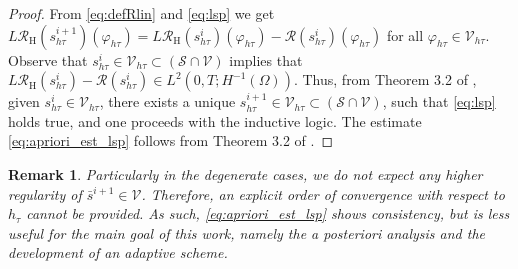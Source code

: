 \documentclass[review,11pt]{article}
\numberwithin{equation}{section}
\def \f  {\varphi}
\def \Om {\Omega}
\def \t  {\tau}
\def \calV {\mathcal{V}}
\def \calR {\mathcal{R}}
\def \resH {{\calR}_{\mathrm{H}}}
\def \calS {\mathcal{S}}
\newtheorem{remark}[remark]{Remark}
\begin{document}
\begin{proof}
From \eqref{eq:defRlin} and \eqref{eq:lsp} we get $ L\resH(s^{i+1}_{h\t})(\f_{h\t})= L\resH(s^{i}_{h\t})(\f_{h\t}) -\calR(s^{i}_{h\t})(\f_{h\t}) $ for all $\f_{h\t}\in \calV_{h\t}$. Observe that $s^{i}_{h\t}\in \calV_{h\t}\subset (\calS\cap \calV)$ implies that $L\resH(s^{i}_{h\t}) -\calR(s^{i}_{h\t})\in L^2(0,T;H^{-1}(\Om))$. Thus, from Theorem 3.2 of \cite{steinbach2015space}, given $s_{h\tau}^i\in \calV_{h\t}$, there exists a unique $s^{i+1}_{h\t}\in \calV_{h\t}\subset (\calS\cap \calV)$, such that \eqref{eq:lsp} holds true, and one proceeds with the inductive logic. The estimate \eqref{eq:apriori_est_lsp} follows from Theorem 3.2 of \cite{steinbach2015space}.
\end{proof}
\begin{remark}
Particularly in the degenerate cases, we do not expect any higher regularity of $\bar{s}^{i+1}\in \calV$. Therefore, an explicit order of convergence with respect to $h_\t$ cannot be provided. As such, \eqref{eq:apriori_est_lsp} shows consistency, but is less useful for the main goal of this work, namely the a posteriori analysis and the development of an adaptive scheme.

\end{remark}
\end{document}
